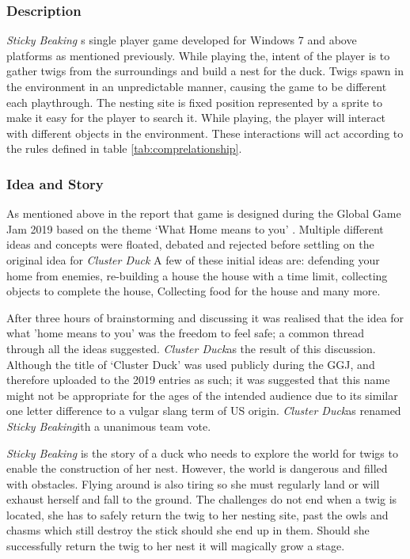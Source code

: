 \documentclass[12pt]{article}
\newcommand{\game}[2]{\textit{#1}}{}
\begin{document}
\subsubsection{Description}
\game{Sticky Beaking{ }} is single player game developed for Windows 7 and above platforms as mentioned previously. While playing the, intent of the player is to gather twigs from the surroundings and build a nest for the duck. Twigs spawn in the environment in an unpredictable manner, causing the game to be different each playthrough. The nesting site is fixed position represented by a sprite to make it easy for the player to search it. While playing, the player will interact with different objects in the environment. These interactions will act according to the rules defined in table \ref{tab:comprelationship}.

\subsubsection{Idea and Story}
As mentioned above in the report that game is designed during the Global Game Jam 2019 based on the theme `What Home means to you' \cite{ggj19theme}. Multiple different ideas and concepts were floated, debated and rejected before settling on the original idea for \game{Cluster Duck}. A few of these initial ideas are: defending your home from enemies, re-building a house the house with a time limit, collecting objects to complete the house, Collecting food for the house and many more. 

After three hours of brainstorming and discussing it was realised that the idea for what 'home means to you'\cite{ggj19theme} was the freedom to feel safe; a common thread through all the ideas suggested. \game{Cluster Duck} was the result of this discussion. Although the title of `Cluster Duck' was used publicly during the GGJ, and therefore uploaded to the 2019 entries as such; it was suggested that this name might not be appropriate for the ages of the intended audience due to its similar one letter difference to a vulgar slang term of US origin. \game{Cluster Duck} was renamed \game{Sticky Beaking} with a unanimous team vote.

\game{Sticky Beaking}{} is the story of a duck who needs to explore the world for twigs to enable the construction of her nest. However, the world is dangerous and filled with obstacles. Flying around is also tiring so she must regularly land or will exhaust herself and fall to the ground. The challenges do not end when a twig is located, she has to safely return the twig to her nesting site, past the owls and chasms which still destroy the stick should she end up in them. Should she successfully return the twig to her nest it will magically grow a stage. 
\end{document}
